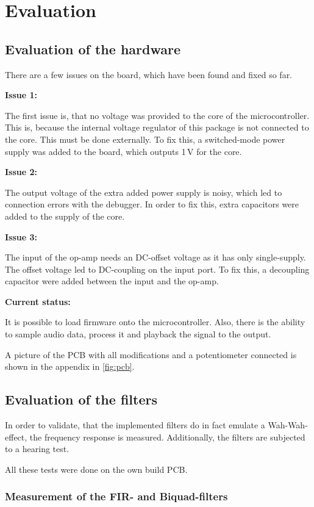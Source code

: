 \section{Evaluation}

\subsection{Evaluation of the hardware}

There are a few issues on the board, which have been found and fixed so far.

\textbf{Issue 1:}

The first issue is, that no voltage was provided to the core of the microcontroller. This is, because
the internal voltage regulator of this package is not connected to the core. This must be done 
externally. To fix this, a switched-mode power supply was added to the board, which outputs 1\,V
for the core.

\textbf{Issue 2:}

The output voltage of the extra added power supply is noisy, which led to connection errors with the debugger.
In order to fix this, extra capacitors were added to the supply of the core.

\textbf{Issue 3:}

The input of the op-amp needs an DC-offset voltage as it has only single-supply. The offset voltage led
to DC-coupling on the input port. To fix this, a decoupling capacitor were added between the input and the op-amp.

\textbf{Current status:}

It is possible to load firmware onto the microcontroller. Also, there is the ability to sample audio data,
process it and playback the signal to the output.

A picture of the \ac{PCB} with all modifications and a potentiometer connected is shown in the appendix in \autoref{fig:pcb}.

\subsection{Evaluation of the filters}

In order to validate, that the implemented filters do in fact emulate a Wah-Wah-effect,
the frequency response is measured. Additionally, the filters are subjected to a hearing test.

All these tests were done on the own build \ac{PCB}.

\subsubsection{Measurement of the \ac{FIR}- and Biquad-filters}

